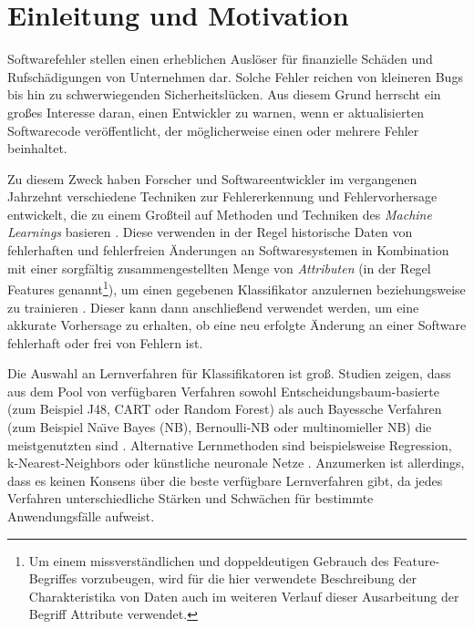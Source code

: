 
\chapter{Einleitung und Motivation}
\label{introduction}

Softwarefehler stellen einen erheblichen Auslöser für finanzielle Schäden und Rufschädigungen von Unternehmen dar. Solche Fehler reichen von kleineren \glqq Bugs\grqq{} bis hin zu schwerwiegenden Sicherheitslücken. Aus diesem Grund herrscht ein großes Interesse daran, einen Entwickler zu warnen, wenn er aktualisierten Softwarecode veröffentlicht, der möglicherweise einen oder mehrere Fehler beinhaltet. 

Zu diesem Zweck haben Forscher und Softwareentwickler im vergangenen Jahrzehnt verschiedene Techniken zur Fehlererkennung und Fehlervorhersage entwickelt, die zu einem Großteil auf Methoden und Techniken des \emph{Machine Learnings} basieren \cite{Challagulla2008}. Diese verwenden in der Regel historische Daten von fehlerhaften und fehlerfreien Änderungen an Softwaresystemen in Kombination mit einer sorgfältig zusammengestellten Menge von \emph{Attributen} (in der Regel Features genannt\footnote{Um einem missverständlichen und doppeldeutigen Gebrauch des Feature-Begriffes vorzubeugen, wird für die hier verwendete Beschreibung der Charakteristika von Daten auch im weiteren Verlauf dieser Ausarbeitung der Begriff \glqq Attribute\grqq{} verwendet.}), um einen gegebenen Klassifikator anzulernen beziehungsweise zu trainieren \cite{Alsaeedi2019,Hammouri2018}. Dieser kann dann anschließend verwendet werden, um eine akkurate Vorhersage zu erhalten, ob eine neu erfolgte Änderung an einer Software fehlerhaft oder frei von Fehlern ist.

Die Auswahl an Lernverfahren für Klassifikatoren ist groß. Studien zeigen, dass aus dem Pool von verfügbaren Verfahren sowohl Entscheidungsbaum-basierte (zum Beispiel J48, CART oder Random Forest) als auch Bayessche Verfahren (zum Beispiel Na\"{\i}ve Bayes (NB), Bernoulli-NB oder multinomieller NB) die meistgenutzten sind \cite{Son2019}. Alternative Lernmethoden sind beispielsweise Regression, k-Nearest-Neighbors oder künstliche neuronale Netze \cite{Challagulla2008}. Anzumerken ist allerdings, dass es keinen Konsens über die beste verfügbare Lernverfahren gibt, da jedes Verfahren unterschiedliche Stärken und Schwächen für bestimmte Anwendungsfälle aufweist.

